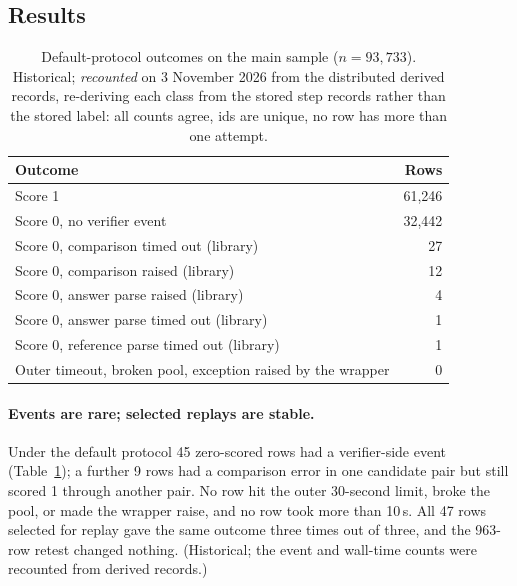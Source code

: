 \documentclass[11pt,a4paper]{article}
\begin{document}
\subsection{Results}
\begin{table}[h]\centering\small
\caption{Default-protocol outcomes on the main sample ($n=93{,}733$). Historical; \emph{recounted} on 3 November 2026 from the distributed derived records, re-deriving each class from the stored step records rather than the stored label: all counts agree, ids are unique, no row has more than one attempt.}\label{tab:main}
\begin{tabular}{@{}lr@{}}\toprule
Outcome & Rows\\\midrule
Score 1 & 61,246\\
Score 0, no verifier event & 32,442\\
Score 0, comparison timed out (library) & 27\\
Score 0, comparison raised (library) & 12\\
Score 0, answer parse raised (library) & 4\\
Score 0, answer parse timed out (library) & 1\\
Score 0, reference parse timed out (library) & 1\\
Outer timeout, broken pool, exception raised by the wrapper & 0\\\bottomrule
\end{tabular}
\end{table}

\paragraph{Events are rare; selected replays are stable.} Under the default protocol 45 zero-scored rows had a verifier-side event (Table~\ref{tab:main}); a further 9 rows had a comparison error in one candidate pair but still scored 1 through another pair. No row hit the outer 30-second limit, broke the pool, or made the wrapper raise, and no row took more than 10\,s. All 47 rows selected for replay gave the same outcome three times out of three, and the 963-row retest changed nothing. (Historical; the event and wall-time counts were recounted from derived records.)
\end{document}
